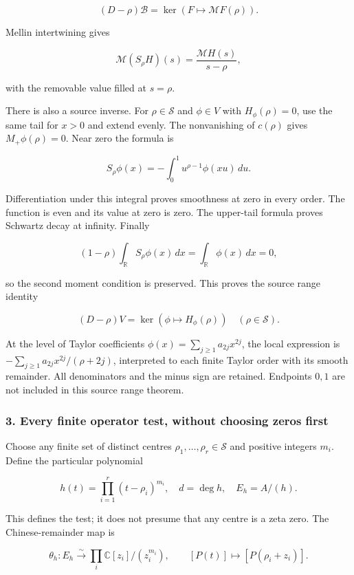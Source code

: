 \[\boxed{(D-\rho)\mathscr B=\ker(F\mapsto\mathcal MF(\rho)).}\]

Mellin intertwining gives

\[\mathcal M(S_\rho H)(s)=\frac{\mathcal MH(s)}{s-\rho},\]

with the removable value filled at \(s=\rho\).

There is also a source inverse. For \(\rho\in\mathscr S\) and \(\phi\in V\) with \(H_\phi(\rho)=0\),
use the same tail for \(x>0\) and extend evenly. The nonvanishing of \(c(\rho)\) gives
\(M_+\phi(\rho)=0\). Near zero the formula is

\[S_\rho\phi(x)=-\int_0^1u^{\rho-1}\phi(xu)\,du.\]

Differentiation under this integral proves smoothness at zero in every order. The function is even
and its value at zero is zero. The upper-tail formula proves Schwartz decay at infinity. Finally

\[(1-\rho)\int_{\mathbb R}S_\rho\phi(x)\,dx=\int_{\mathbb R}\phi(x)\,dx=0,\]

so the second moment condition is preserved. This proves the source range identity

\[\boxed{(D-\rho)V=\ker(\phi\mapsto H_\phi(\rho))\quad(\rho\in\mathscr S).}\]

At the level of Taylor coefficients \(\phi(x)=\sum_{j\ge1}a_{2j}x^{2j}\), the local expression is
\(-\sum_{j\ge1}a_{2j}x^{2j}/(\rho+2j)\), interpreted to each finite Taylor order with its smooth
remainder. All denominators and the minus sign are retained. Endpoints \(0,1\) are not included in
this source range theorem.

\subsubsection{3. Every finite operator test, without choosing zeros
first}\label{pr_8:every-finite-operator-test-without-choosing-zeros-first}

Choose any finite set of distinct centres \(\rho_1,\ldots,\rho_r\in\mathscr S\) and positive
integers \(m_i\). Define the particular polynomial

\[h(t)=\prod_{i=1}^r(t-\rho_i)^{m_i},\quad d=\deg h,\quad E_h=A/(h).\]

This defines the test; it does not presume that any centre is a zeta zero. The Chinese-remainder map
is

\[\theta_h:E_h\xrightarrow{\sim}\prod_i\mathbb C[z_i]/(z_i^{m_i}),\qquad
[P(t)]\mapsto[P(\rho_i+z_i)].\]

